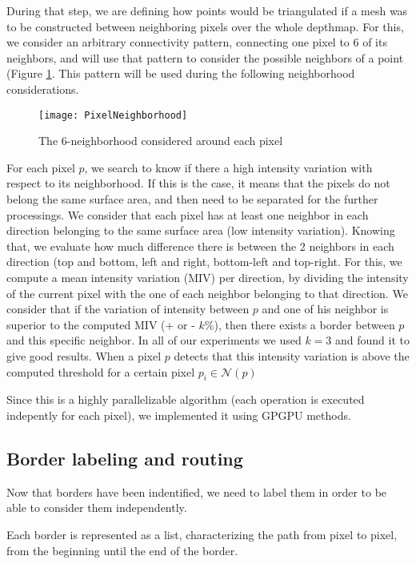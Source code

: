 \documentclass[11pt,fleqn]{book} %
\begin{document}
During that step, we are defining how points would be triangulated if a mesh was to be constructed between neighboring pixels over the whole depthmap. For this, we consider an arbitrary connectivity pattern, connecting one pixel to 6 of its neighbors, and will use that pattern to consider the possible neighbors of a point (Figure \ref{fig:pixel_neighborhood}. This pattern will be used during the following neighborhood considerations.

\begin{figure}[ht]
\centering\texttt{[image: PixelNeighborhood]}
\caption{The 6-neighborhood considered around each pixel}
\label{fig:pixel_neighborhood}
\end{figure}

For each pixel $p$, we search to know if there a high intensity variation with respect to its neighborhood. If this is the case, it means that the pixels do not belong the same surface area, and then need to be separated for the further processings.
We consider that each pixel has at least one neighbor in each direction belonging to the same surface area (low intensity variation). Knowing that, we evaluate how much difference there is between the 2 neighbors in each direction (top and bottom, left and right, bottom-left and top-right.
For this, we compute a mean intensity variation (MIV) per direction, by dividing the intensity of the current pixel with the one of each neighbor belonging to that direction. We consider that if the variation of intensity between $p$ and one of his neighbor is superior to the computed MIV (+ or - $k$\%), then there exists a border between $p$ and this specific neighbor. In all of our experiments we used $k = 3$ and found it to give good results.
When a pixel $p$ detects that this intensity variation is above the computed threshold for a certain pixel $p_i \in \mathcal{N}(p)$

Since this is a highly parallelizable algorithm (each operation is executed indepently for each pixel), we implemented it using GPGPU methods.

\subsection{Border labeling and routing}
Now that borders have been indentified, we need to label them in order to be able to consider them independently. 

Each border is represented as a list, characterizing the path from pixel to pixel, from the beginning until the end of the border.
\end{document}
